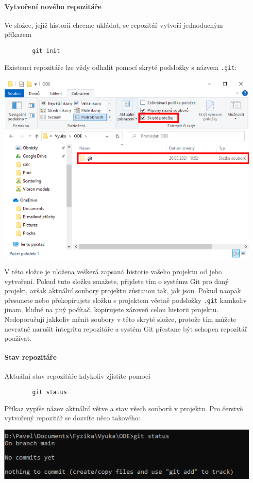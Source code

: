 \documentclass[a4paper,11pt,twoside]{article}
\newcommand{\subsubsubsection}[1]{\paragraph{#1}\mbox{}

}
\def\code#1{\textnormal{\texttt{#1}}}
\theoremstyle{red}
\theoremstyle{green}
\begin{document}
\subsubsubsection{Vytvoření nového repozitáře}
    Ve složce, jejíž historii chceme ukládat, se repozitář vytvoří jednoduchým příkazem
    \begin{lstlisting}
        git init\end{lstlisting}
    Existenci repozitáře lze vždy odhalit pomocí skryté podsložky s názvem \code{.git}:
    \begin{center}\includegraphics[width=0.7\linewidth]{FolderGit.png}\end{center}
    V této složce je uložena veškerá zapsaná historie vašeho projektu od jeho vytvoření.
    Pokud tuto složku smažete, přijdete tím o  systému Git pro daný projekt, avšak aktuální soubory projektu zůstanou tak, jak jsou.
    Pokud naopak přesunete nebo překopírujete složku s projektem včetně podsložky \code{.git} kamkoliv jinam, klidně na jiný počítač, kopírujete zároveň celou historii projektu.
    Nedoporučuji jakkoliv měnit soubory v této skryté složce, protože tím můžete nevratně narušit integritu repozitáře a systém Git přestane být schopen repozitář používat.

\subsubsubsection{Stav repozitáře}
    Aktuální stav repozitáře kdykoliv zjistíte pomocí
    \begin{lstlisting}
        git status\end{lstlisting}
    Příkaz vypíše název aktuální větve a stav všech souborů v projektu.
    Pro čerstvě vytvořený repozitář se dozvíte něco takového:
    \begin{center}\includegraphics[width=0.6\linewidth]{GitStatusEmpty.png}\end{center}
\end{document}
